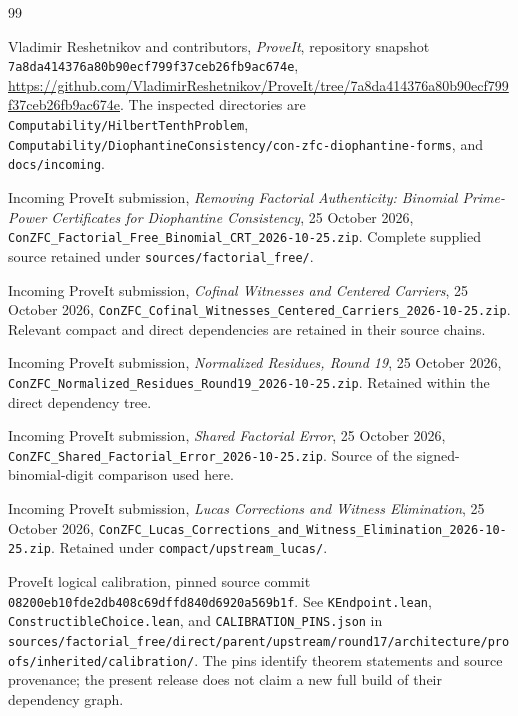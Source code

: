 \documentclass[11pt]{article}
\theoremstyle{definition}
\begin{document}
\begin{thebibliography}{99}
\raggedright
{} Vladimir Reshetnikov and contributors,
\emph{ProveIt}, repository snapshot
\texttt{7a8da414376a80b90ecf799f37ceb26fb9ac674e},
\url{https://github.com/VladimirReshetnikov/ProveIt/tree/7a8da414376a80b90ecf799f37ceb26fb9ac674e}.
The inspected directories are \nolinkurl{Computability/HilbertTenthProblem},
\nolinkurl{Computability/DiophantineConsistency/con-zfc-diophantine-forms},
and \nolinkurl{docs/incoming}.

 Incoming ProveIt submission,
\emph{Removing Factorial Authenticity: Binomial Prime-Power Certificates
for Diophantine Consistency}, 25 October 2026,
\nolinkurl{ConZFC_Factorial_Free_Binomial_CRT_2026-10-25.zip}.
Complete supplied source retained under \nolinkurl{sources/factorial_free/}.

 Incoming ProveIt submission,
\emph{Cofinal Witnesses and Centered Carriers}, 25 October 2026,
\nolinkurl{ConZFC_Cofinal_Witnesses_Centered_Carriers_2026-10-25.zip}.
Relevant compact and direct dependencies are retained in their source chains.

 Incoming ProveIt submission,
\emph{Normalized Residues, Round 19}, 25 October 2026,
\nolinkurl{ConZFC_Normalized_Residues_Round19_2026-10-25.zip}.
Retained within the direct dependency tree.

 Incoming ProveIt submission,
\emph{Shared Factorial Error}, 25 October 2026,
\nolinkurl{ConZFC_Shared_Factorial_Error_2026-10-25.zip}.
Source of the signed-binomial-digit comparison used here.

 Incoming ProveIt submission,
\emph{Lucas Corrections and Witness Elimination}, 25 October 2026,
\nolinkurl{ConZFC_Lucas_Corrections_and_Witness_Elimination_2026-10-25.zip}.
Retained under \nolinkurl{compact/upstream_lucas/}.

 ProveIt logical calibration, pinned source commit
\texttt{08200eb10fde2db408c69dffd840d6920a569b1f}.
See \nolinkurl{KEndpoint.lean}, \nolinkurl{ConstructibleChoice.lean},
and \nolinkurl{CALIBRATION_PINS.json} in
\nolinkurl{sources/factorial_free/direct/parent/upstream/round17/architecture/proofs/inherited/calibration/}.
The pins identify theorem statements and source provenance; the present
release does not claim a new full build of their dependency graph.
\end{thebibliography}
\end{document}
